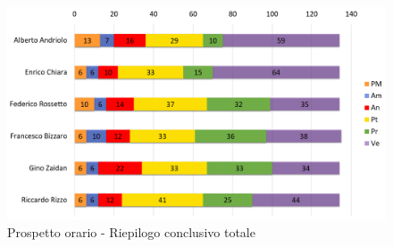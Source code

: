 \begin{figure}[H]
	\centering
	\includegraphics[width= 14cm]{immagini/tot_istogramma.png}
	\caption{Prospetto orario - Riepilogo conclusivo totale}
\end{figure}
\newpage

